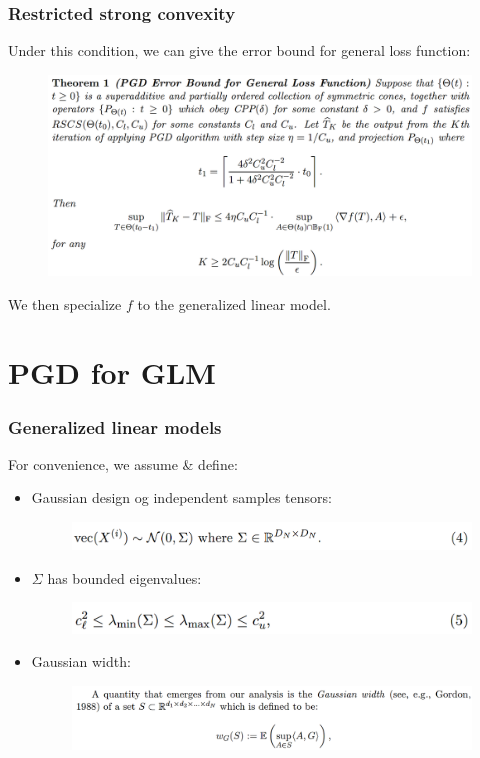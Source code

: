 \documentclass{beamer}
\begin{document}
	\begin{frame}
		\frametitle{Restricted strong convexity}
		Under this condition, we can give the error bound for general loss function:
		\begin{figure}
			\includegraphics[width=1\linewidth]{image016.png}
		\end{figure}
		We then specialize $f$ to the generalized linear model.
	\end{frame}
	
	\section{PGD for GLM}
	
	\begin{frame}
		\frametitle{Generalized linear models}
		For convenience, we assume \& define:
		\begin{itemize}
			\item 
			Gaussian design og independent samples tensors:
			\begin{figure}
				\includegraphics[width=.8\linewidth]{image017.png}
			\end{figure}
			\item
			$\Sigma$ has bounded eigenvalues:
			\begin{figure}
				\includegraphics[width=.8\linewidth]{image018.png}
			\end{figure}
			\item
			Gaussian width:
			\begin{figure}
				\includegraphics[width=1\linewidth]{image019.png}
			\end{figure}
		\end{itemize}
	\end{frame}
	
\end{document}
